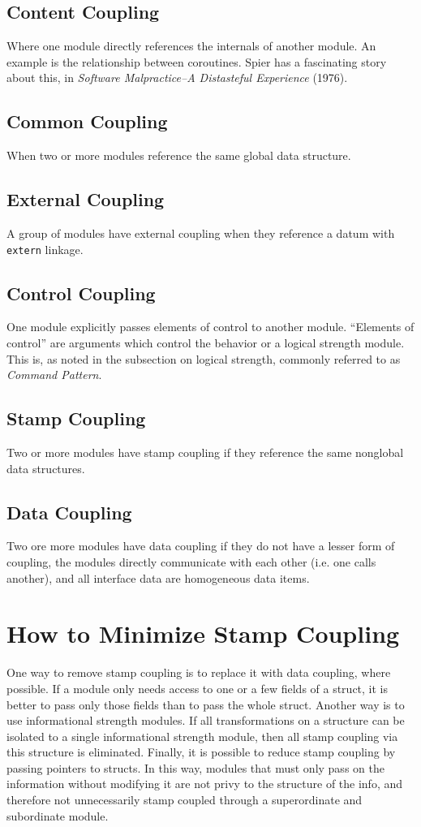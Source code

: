 \documentclass{designdoc}
\begin{document}
\subsection{Content Coupling}
Where one module directly references the internals of another module. An
example is the relationship between coroutines. Spier has a fascinating
story about this, in {\it Software Malpractice--A Distasteful Experience}
(1976).

\subsection{Common Coupling}
When two or more modules reference the same global data structure.

\subsection{External Coupling}
A group of modules have external coupling when they reference a datum with
\texttt{extern} linkage.

\subsection{Control Coupling}
One module explicitly passes elements of control to another module. ``Elements
of control'' are arguments which control the behavior or a logical strength
module. This is, as noted in the subsection on logical strength, commonly
referred to as {\it Command Pattern}.

\subsection{Stamp Coupling}
Two or more modules have stamp coupling if they reference the same nonglobal
data structures.

\subsection{Data Coupling}
Two ore more modules have data coupling if they do not have a lesser form of
coupling, the modules directly communicate with each other (i.e. one calls
another), and all interface data are homogeneous data items.

\section{How to Minimize Stamp Coupling}
One way to remove stamp coupling is to replace it with data coupling, where
possible. If a module only needs access to one or a few fields of a struct,
it is better to pass only those fields than to pass the whole struct. Another
way is to use informational strength modules. If all transformations on a
structure can be isolated to a single informational strength module, then all
stamp coupling via this structure is eliminated. Finally, it is possible to
reduce stamp coupling by passing pointers to structs. In this way, modules that
must only pass on the information without modifying it are not privy to the
structure of the info, and therefore not unnecessarily stamp coupled through a
superordinate and subordinate module.
\end{document}
